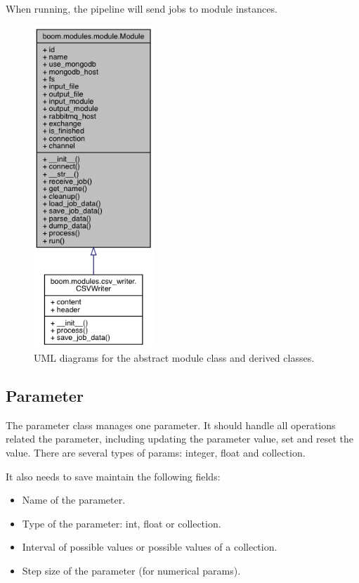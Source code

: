 \documentclass{article}
\begin{document}
    When running, the pipeline will send jobs to module instances.

    \begin{figure}[H]
        \begin{center}
            \includegraphics[width=0.4\textwidth]{fig/module_uml.png}
        \end{center}
        \label{fig:module_uml}
        \caption{UML diagrams for the abstract module class and derived classes.}
    \end{figure}

    \subsection{Parameter}
    \label{sec:parameter}
    The parameter class manages one parameter.
    It should handle all operations related the parameter,
    including updating the parameter value,
    set and reset the value.
    There are several types of params: integer, float and collection.

    It also needs to save maintain the following fields:
    \begin{itemize}
        \item Name of the parameter.
        \item Type of the parameter: int, float or collection.
        \item Interval of possible values or possible values of a collection.
        \item Step size of the parameter (for numerical params).
    \end{itemize}
\end{document}
